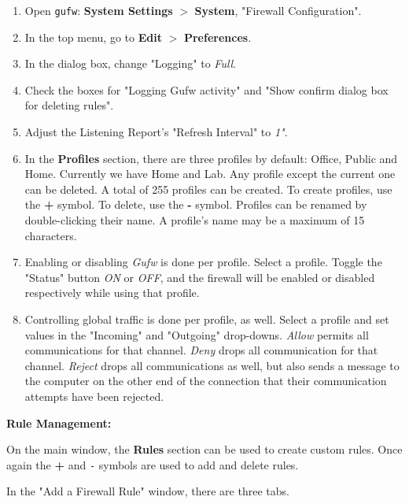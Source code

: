 \documentclass[12pt]{extarticle}
\begin{document}
\begin{enumerate}

\item Open \texttt{gufw}: \textbf{System Settings} $>$ \textbf{System}, "Firewall Configuration".

\item In the top menu, go to \textbf{Edit} $>$ \textbf{Preferences}.

\item In the dialog box, change "Logging" to \textit{Full}. 

\item Check the boxes for "Logging Gufw activity" and "Show confirm dialog box for deleting rules". 

\item Adjust the Listening Report's "Refresh Interval" to \textit{1"}.

\item In the \textbf{Profiles} section, there are three profiles by default: Office, Public and Home. Currently we have Home and Lab. Any profile except the current one can be deleted. A total of 255 profiles can be created. To create profiles, use the \textbf{+} symbol. To delete, use the \textbf{-} symbol. Profiles can be renamed by double-clicking their name. A profile's name may be a maximum of 15 characters. 

\item Enabling or disabling \textit{Gufw} is done per profile. Select a profile. Toggle the "Status" button \textit{ON} or \textit{OFF}, and the firewall will be enabled or disabled respectively while using that profile.

\item Controlling global traffic is done per profile, as well. Select a profile and set values in the "Incoming" and "Outgoing" drop-downs. \textit{Allow} permits all communications for that channel. \textit{Deny} drops all communication for that channel. \textit{Reject} drops all communications as well, but also sends a message to the computer on the other end of the connection that their communication attempts have been rejected.
\end{enumerate}

\item \textbf{Rule Management:}

On the main window, the \textbf{Rules} section can be used to create custom rules. Once again the \textbf{+} and \texttt{-} symbols are used to add and delete rules. 

In the "Add a Firewall Rule" window, there are three tabs.
\end{document}
